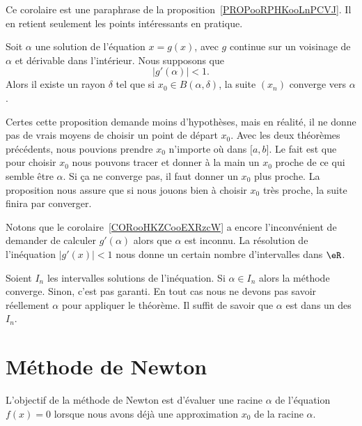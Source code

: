 Ce corolaire est une paraphrase de la proposition~\ref{PROPooRPHKooLnPCVJ}. Il en retient seulement les points intéressants en pratique.

\begin{corollary}     \label{CORooHKZCooEXRzcW}
	Soit \( \alpha\) une solution de l'équation \( x=g(x)\), avec \( g\) continue sur un voisinage de \( \alpha\) et dérivable dans l'intérieur. Nous supposons que
	\begin{equation}
		| g'(\alpha) |<1.
	\end{equation}
	Alors il existe un rayon \( \delta\) tel que si \( x_0\in B(\alpha,\delta)\), la suite \( (x_n)\) converge vers \( \alpha\).
\end{corollary}

Certes cette proposition demande moins d'hypothèses, mais en réalité, il ne donne pas de vrais moyens de choisir un point de départ \( x_0\). Avec les deux théorèmes précédents, nous pouvions prendre \( x_0\) n'importe où dans \( \mathopen[ a , b \mathclose]\). Le fait est que pour choisir \( x_0\) nous pouvons tracer et donner à la main un \( x_0\) proche de ce qui semble être \( \alpha\). Si ça ne converge pas, il faut donner un \(x_0\) plus proche. La proposition nous assure que si nous jouons bien à choisir \( x_0\) très proche, la suite finira par converger.

Notons que le corolaire~\ref{CORooHKZCooEXRzcW} a encore l'inconvénient de demander de calculer \( g'(\alpha)\) alors que \( \alpha\) est inconnu. La résolution de l'inéquation \( | g'(x) |<1\) nous donne un certain nombre d'intervalles dans \( \eR\).

Soient \( I_n\) les intervalles solutions de l'inéquation.  Si \( \alpha\in I_n\) alors la méthode converge. Sinon, c'est pas garanti. En tout cas nous ne devons pas savoir réellement \( \alpha\) pour appliquer le théorème. Il suffit de savoir que \( \alpha\) est dans un des \( I_n\).

\section{Méthode de Newton}
\label{SECooIKXNooACLljs}

L'objectif de la méthode de Newton est d'évaluer une racine \( \alpha\) de l'équation \( f(x)=0\) lorsque nous avons déjà une approximation \( x_0\) de la racine \( \alpha\).

